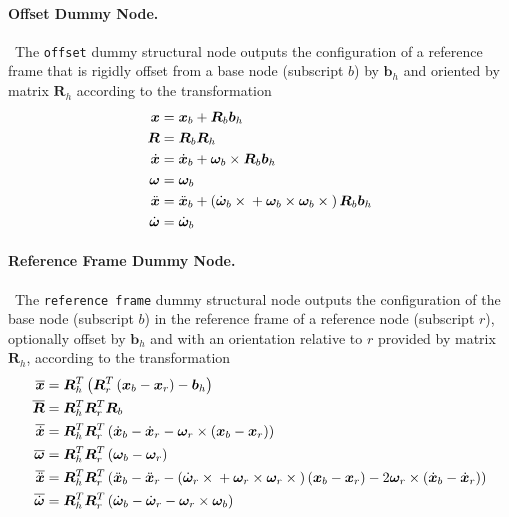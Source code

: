 \documentclass[10pt,fleqn,subeqn]{report}
\newcommand{\T}[1]{\bm{#1}}
\begin{document}
\paragraph{Offset Dummy Node.} \
The \texttt{offset} dummy structural node outputs the configuration
of a reference frame that is rigidly offset from a base node
(subscript $b$) by $\T{b}_h$ and oriented by matrix $\T{R}_h$ according 
to the transformation
\begin{subequations}
\begin{align}
	\T{x} &= \T{x}_b + \T{R}_b \T{b}_h \\
	\T{R} &= \T{R}_b \T{R}_h \\
	\dot{\T{x}} &= \dot{\T{x}}_b + \T{\omega}_b \times \T{R}_b \T{b}_h \\
	\T{\omega} &= \T{\omega}_b \\
	\ddot{\T{x}} &= \ddot{\T{x}}_b + \plbr{
		\dot{\T{\omega}}_b \times{}
		+ \T{\omega}_b \times \T{\omega}_b \times{}
	} \T{R}_b \T{b}_h \\
	\dot{\T{\omega}} &= \dot{\T{\omega}}_b
\end{align}
\end{subequations}


\paragraph{Reference Frame Dummy Node.} \
The \texttt{reference frame} dummy structural node
outputs the configuration of the base node (subscript $b$)
in the reference frame of a reference node (subscript $r$),
optionally offset by $\T{b}_h$ and with an orientation relative 
to $r$ provided by matrix $\T{R}_h$,
according to the transformation
\begin{subequations}
\begin{align}
	\overline{\T{x}} &= \T{R}_h^T \plbr{\T{R}_r^T \plbr{\T{x}_b - \T{x}_r} - \T{b}_h}\\
	\overline{\T{R}} &= \T{R}_h^T \T{R}_r^T \T{R}_b \\
	\overline{\dot{\T{x}}} &= \T{R}_h^T \T{R}_r^T \plbr{
		\dot{\T{x}}_b
		- \dot{\T{x}}_r
		- \T{\omega}_r\times\plbr{\T{x}_b - \T{x}_r}
	} \\
	\overline{\T{\omega}} &= \T{R}_h^T \T{R}_r^T \plbr{\T{\omega}_b - \T{\omega}_r} \\
	\overline{\ddot{\T{x}}} &= \T{R}_h^T \T{R}_r^T \plbr{
		\ddot{\T{x}}_b
		- \ddot{\T{x}}_r
		- \plbr{
			\dot{\T{\omega}}_r \times{}
			+ \T{\omega}_r \times \T{\omega}_r \times{}
		} \plbr{\T{x}_b - \T{x}_r}
		- 2 \T{\omega}_r \times \plbr{\dot{\T{x}}_b - \dot{\T{x}}_r}
	} \\
	\overline{\dot{\T{\omega}}} &= \T{R}_h^T \T{R}_r^T \plbr{
		\dot{\T{\omega}}_b
		- \dot{\T{\omega}}_r
		- \T{\omega}_r \times \T{\omega}_b
	}
\end{align}
\end{subequations}
\end{document}
